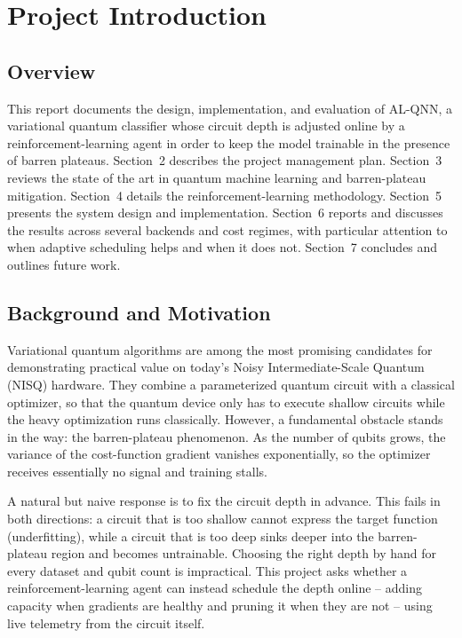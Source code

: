 \section{Project Introduction}
\subsection{Overview}
This report documents the design, implementation, and evaluation of AL-QNN, a variational quantum classifier whose circuit depth is adjusted online by a reinforcement-learning agent in order to keep the model trainable in the presence of barren plateaus. Section~2 describes the project management plan. Section~3 reviews the state of the art in quantum machine learning and barren-plateau mitigation. Section~4 details the reinforcement-learning methodology. Section~5 presents the system design and implementation. Section~6 reports and discusses the results across several backends and cost regimes, with particular attention to when adaptive scheduling helps and when it does not. Section~7 concludes and outlines future work.

\subsection{Background and Motivation}
Variational quantum algorithms are among the most promising candidates for demonstrating practical value on today's Noisy Intermediate-Scale Quantum (NISQ) hardware. They combine a parameterized quantum circuit with a classical optimizer, so that the quantum device only has to execute shallow circuits while the heavy optimization runs classically. However, a fundamental obstacle stands in the way: the barren-plateau phenomenon. As the number of qubits grows, the variance of the cost-function gradient vanishes exponentially, so the optimizer receives essentially no signal and training stalls.

A natural but naive response is to fix the circuit depth in advance. This fails in both directions: a circuit that is too shallow cannot express the target function (underfitting), while a circuit that is too deep sinks deeper into the barren-plateau region and becomes untrainable. Choosing the right depth by hand for every dataset and qubit count is impractical. This project asks whether a reinforcement-learning agent can instead schedule the depth online -- adding capacity when gradients are healthy and pruning it when they are not -- using live telemetry from the circuit itself.

